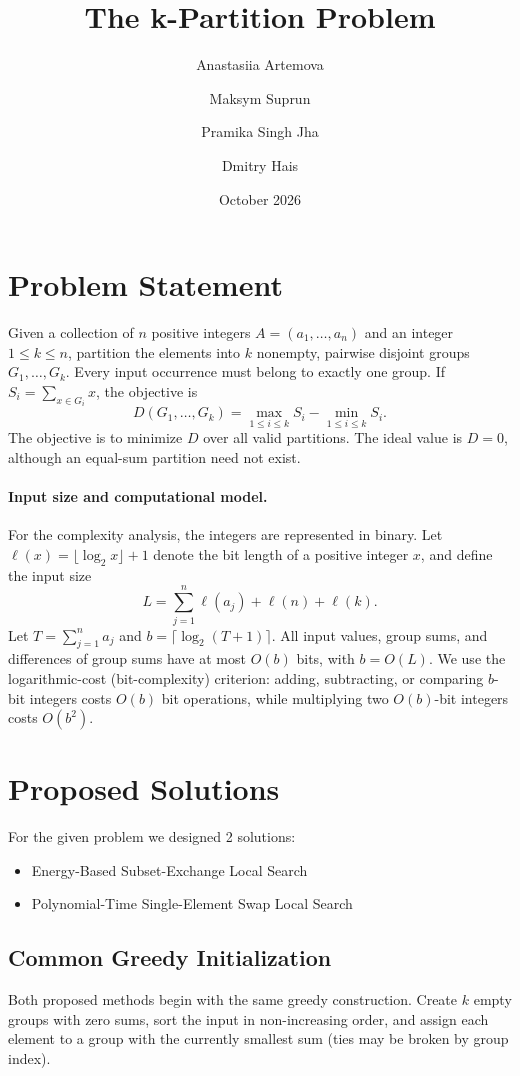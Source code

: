 \documentclass[11pt,a4paper]{article}
\title{The k-Partition Problem}
\author{Anastasiia Artemova \and Maksym Suprun \and Pramika Singh Jha \and Dmitry Hais}
\date{October 2026}
\begin{document}
\maketitle
\tableofcontents
\newpage
\section{Problem Statement}
Given a collection of $n$ positive integers $A=(a_1,\ldots,a_n)$ and an integer $1\le k\le n$, partition the elements into $k$ nonempty, pairwise disjoint groups $G_1,\ldots,G_k$. Every input occurrence must belong to exactly one group. If $S_i=\sum_{x\in G_i}x$, the objective is
\begin{equation}\label{eq:objective}
D(G_1,\ldots,G_k)=\max_{1\le i\le k}S_i-\min_{1\le i\le k}S_i.
\end{equation}
The objective is to minimize $D$ over all valid partitions. The ideal value is $D=0$, although an equal-sum partition need not exist.

\paragraph{Input size and computational model.}
For the complexity analysis, the integers are represented in binary. Let $\ell(x)=\lfloor\log_2 x\rfloor+1$ denote the bit length of a positive integer $x$, and define the input size
\begin{equation}\label{eq:inputsize}
L=\sum_{j=1}^{n}\ell(a_j)+\ell(n)+\ell(k).
\end{equation}
Let $T=\sum_{j=1}^{n}a_j$ and $b=\lceil\log_2(T+1)\rceil$. All input values, group sums, and differences of group sums have at most $O(b)$ bits, with $b=O(L)$. We use the logarithmic-cost (bit-complexity) criterion: adding, subtracting, or comparing $b$-bit integers costs $O(b)$ bit operations, while multiplying two $O(b)$-bit integers costs $O(b^2)$.

\section{Proposed Solutions}
For the given problem we designed 2 solutions:
\begin{itemize}
\item Energy-Based Subset-Exchange Local Search
\item Polynomial-Time Single-Element Swap Local Search
\end{itemize}
\subsection{Common Greedy Initialization}
Both proposed methods begin with the same greedy construction. Create $k$ empty groups with zero sums, sort the input in non-increasing order, and assign each element to a group with the currently smallest sum (ties may be broken by group index).
\end{document}
